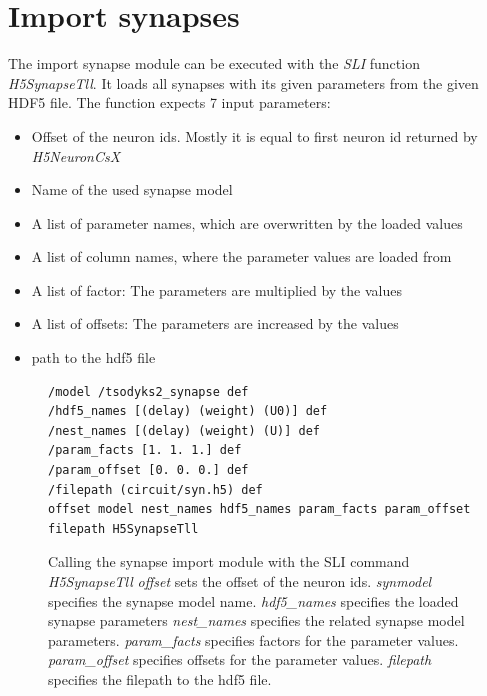 \section{Import synapses}
The import synapse module can be executed with the \emph{SLI} function  \emph{H5SynapseTll}. It loads all synapses with its given parameters
from the given HDF5 file. The function expects 7 input parameters:
 
\begin{itemize}
      \item Offset of the neuron ids. Mostly it is equal to first neuron id returned by \emph{H5NeuronCsX}
      \item Name of the used synapse model
      \item A list of parameter names, which are overwritten by the loaded values
      \item A list of column names, where the parameter values are loaded from
      \item A list of factor: The parameters are multiplied by the values
      \item A list of offsets: The parameters are increased by the values
      \item path to the hdf5 file
\end{itemize}
\begin{figure}[ht!]
\begin{lstlisting}[label=sliSynapses, caption=Example usage of the import synapse module]
/model /tsodyks2_synapse def
/hdf5_names [(delay) (weight) (U0)] def
/nest_names [(delay) (weight) (U)] def
/param_facts [1. 1. 1.] def
/param_offset [0. 0. 0.] def
/filepath (circuit/syn.h5) def
offset model nest_names hdf5_names param_facts param_offset filepath H5SynapseTll
\end{lstlisting}
\caption{Calling the synapse import module with the
SLI command \emph{H5SynapseTll}
\emph{offset} sets the offset of the neuron ids.
\emph{synmodel} specifies the synapse model name.
\emph{hdf5\_names} specifies the loaded synapse parameters
\emph{nest\_names} specifies the related synapse model parameters.
\emph{param\_facts} specifies factors for the parameter values.
\emph{param\_offset} specifies offsets for the parameter values.
\emph{filepath} specifies the filepath to the hdf5 file.}
\end{figure}

